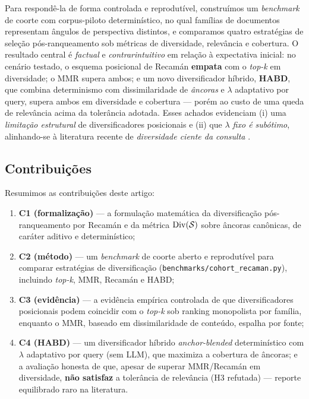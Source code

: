 Para respondê-la de forma controlada e reprodutível, construímos um
\emph{benchmark} de coorte com corpus-piloto determinístico, no qual famílias de
documentos representam ângulos de perspectiva distintos, e comparamos quatro
estratégias de seleção pós-ranqueamento sob métricas de diversidade, relevância
e cobertura. O resultado central é \emph{factual} e \emph{contrarintuitivo} em
relação à expectativa inicial: no cenário testado, o esquema posicional de
Recamán \textbf{empata} com o \emph{top-k} em diversidade; o MMR supera ambos;
e um novo diversificador híbrido, \textbf{HABD}, que combina determinismo com
dissimilaridade de \emph{âncoras} e $\lambda$ adaptativo por query, supera ambos
em diversidade e cobertura — porém ao custo de uma queda de relevância acima da
tolerância adotada. Esses achados evidenciam (i) uma \emph{limitação estrutural}
de diversificadores posicionais e (ii) que \emph{$\lambda$ fixo é subótimo},
alinhando-se à literatura recente de \emph{diversidade ciente da consulta}
\citep{Khan2026DFRAG,RezaeiDieng2025VendiRAG}.

\subsection{Contribuições}

Resumimos as contribuições deste artigo:

\begin{enumerate}
  \item \textbf{C1 (formalização)} — a formulação matemática da diversificação
        pós-ranqueamento por Recamán e da métrica $\mathrm{Div}(\mathcal{S})$ sobre
        âncoras canônicas, de caráter aditivo e determinístico;
  \item \textbf{C2 (método)} — um \emph{benchmark} de coorte aberto e
        reprodutível para comparar estratégias de diversificação
        (\texttt{benchmarks/cohort\_recaman.py}), incluindo \emph{top-k}, MMR,
        Recamán e HABD;
  \item \textbf{C3 (evidência)} — a evidência empírica controlada de que
        diversificadores posicionais podem coincidir com o \emph{top-k} sob
        ranking monopolista por família, enquanto o MMR, baseado em
        dissimilaridade de conteúdo, espalha por fonte;
  \item \textbf{C4 (HABD)} — um diversificador híbrido \emph{anchor-blended}
        determinístico com $\lambda$ adaptativo por query (sem LLM), que
        maximiza a cobertura de âncoras; e a avaliação honesta de que, apesar
        de superar MMR/Recamán em diversidade, \textbf{não satisfaz} a
        tolerância de relevância (H3 refutada) — reporte equilibrado raro na
        literatura.
\end{enumerate}

